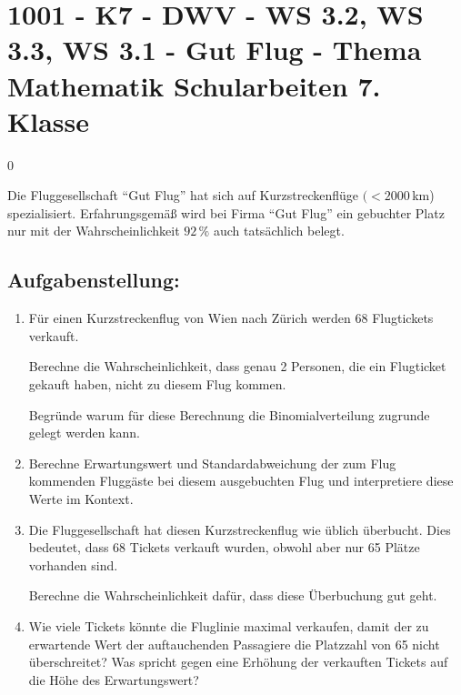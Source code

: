 \section{1001 - K7 - DWV - WS 3.2, WS 3.3, WS 3.1 - Gut Flug - Thema Mathematik Schularbeiten 7. Klasse}

\begin{langesbeispiel} \item[0] %
	
Die Fluggesellschaft "`Gut Flug"' hat sich auf Kurzstreckenflüge $(<2000$\,km) spezialisiert. Erfahrungsgemäß wird bei Firma "`Gut Flug"' ein gebuchter Platz nur mit der Wahrscheinlichkeit $92\,\%$ auch tatsächlich belegt.

\subsection{Aufgabenstellung:}
\begin{enumerate}
	\item Für einen Kurzstreckenflug von Wien nach Zürich werden 68 Flugtickets verkauft.\leer
	
	 Berechne die Wahrscheinlichkeit, dass genau 2 Personen, die ein Flugticket gekauft haben, nicht zu diesem Flug kommen.\leer
	
	Begründe warum für diese Berechnung die Binomialverteilung zugrunde gelegt werden kann.\leer
	
	\item Berechne Erwartungswert und Standardabweichung der zum Flug kommenden Fluggäste bei diesem ausgebuchten Flug und interpretiere diese Werte im Kontext.\leer
	
	\item Die Fluggesellschaft hat diesen Kurzstreckenflug wie üblich überbucht. Dies bedeutet, dass 68 Tickets verkauft wurden, obwohl aber nur 65 Plätze vorhanden sind.\leer
	
	Berechne die Wahrscheinlichkeit dafür, dass diese Überbuchung gut geht.
	
	\item Wie viele Tickets könnte die Fluglinie maximal verkaufen, damit der zu erwartende Wert der auftauchenden Passagiere die Platzzahl von 65 nicht überschreitet? Was spricht gegen eine Erhöhung der verkauften Tickets auf die Höhe des Erwartungswert?
\end{enumerate}

\end{langesbeispiel}
